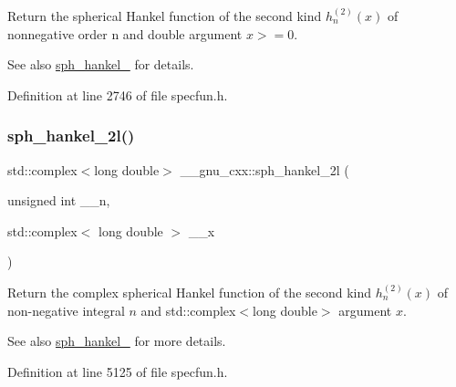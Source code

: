 Return the spherical Hankel function of the second kind $ h^{(2)}_n(x)$ of nonnegative order n and { double} argument $ x >= 0 $.

\begin{DoxySeeAlso}{See also}
\hyperlink{group__gnu__math__spec__func_ga1ca08866a25e3637b04c57ff5a0c36a5}{sph\+\_\+hankel\+\_} for details. 
\end{DoxySeeAlso}


Definition at line 2746 of file specfun.\+h.

\mbox{\label{group__gnu__math__spec__func_ga3d9d9aaceba455a5ddc79d178ee1cb6d}} 
\subsubsection{\texorpdfstring{sph\+\_\+hankel\+\_\+2l()}{sph\_hankel\_2l()}\hspace{0.1cm}{\footnotesize\ttfamily [2/2]}}
{\footnotesize\ttfamily std\+::complex$<$long double$>$ \+\_\+\+\_\+gnu\+\_\+cxx\+::sph\+\_\+hankel\+\_\+2l (\begin{DoxyParamCaption}\item[{unsigned int}]{\+\_\+\+\_\+n,  }\item[{std\+::complex$<$ long double $>$}]{\+\_\+\+\_\+x }\end{DoxyParamCaption})\hspace{0.3cm}{\ttfamily [inline]}}

Return the complex spherical Hankel function of the second kind $ h^{(2)}_n(x) $ of non-\/negative integral $ n $ and {\ttfamily std\+::complex$<$long double$>$} argument $ x $.

\begin{DoxySeeAlso}{See also}
\hyperlink{group__gnu__math__spec__func_ga1ca08866a25e3637b04c57ff5a0c36a5}{sph\+\_\+hankel\+\_} for more details. 
\end{DoxySeeAlso}


Definition at line 5125 of file specfun.\+h.

\mbox{\label{group__gnu__math__spec__func_gacbff28988d5d36f0c3b3fe03d4f57896}} 
